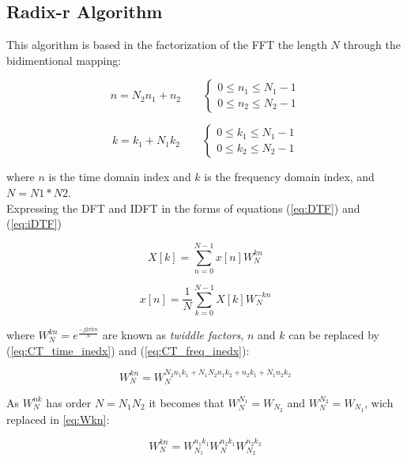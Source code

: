 \documentclass[conference]{IEEEtran}
\begin{document}
\subsection{Radix-r Algorithm}

This algorithm is based in the factorization of the FFT the length $N$ through the bidimentional mapping: 

\begin{equation}
n = N_2n_1 + n_2 \qquad 
	\begin{cases}
	0\leq n_1 \leq N_1 -1 \\
	0\leq n_2 \leq N_2 -1
	\end{cases}
\label{eq:CT_time_inedx}
\end{equation}

\begin{equation}
k = k_1 + N_1k_2 \qquad 
	\begin{cases}
	0\leq k_1 \leq N_1 -1 \\
	0\leq k_2 \leq N_2 -1
	\end{cases}
\label{eq:CT_freq_inedx}
\end{equation}

where $n$ is the time domain index and $k$ is the frequency domain index, and $N=N1*N2$.\\

Expressing the DFT and IDFT in the forms of equations (\ref{eq:DTF}) and (\ref{eq:iDTF})

\begin{equation}
X[k] = \sum_{n=0}^{N-1}x[n]W_N^{kn}
\label{eq:DTF}
\end{equation}

\begin{equation}
x[n] = \frac{1}{N}\sum_{k=0}^{N-1}X[k]W_N^{-kn}
\label{eq:iDTF}
\end{equation}

where $W_N^{kn}=e^{\frac{-j2\pi kn}{N}}$ are known as \textit{twiddle factors}, $n$ and $k$ can be replaced by (\ref{eq:CT_time_inedx})
and (\ref{eq:CT_freq_inedx}):

\begin{equation}
W_N^{kn}=W_N^{N_2n_1k_1+N_1N_2n_1k_2+n_2k_1+N_1n_2k_2} 
\label{eq:Wkn}
\end{equation}

As $W_N^{nk}$ has order $N=N_1N_2$ it becomes that $W_N^{N_1}=W_{N_2}$ and
$W_N^{N_2}=W_{N_1}$, wich replaced in \ref{eq:Wkn}:

\begin{equation}
W_N^{kn}=W_{N_1}^{n_1k_1}W_N^{n_2k_1}W_{N_2}^{n_2k_2} 
\label{eq:Wkn_red}
\end{equation}
\end{document}
